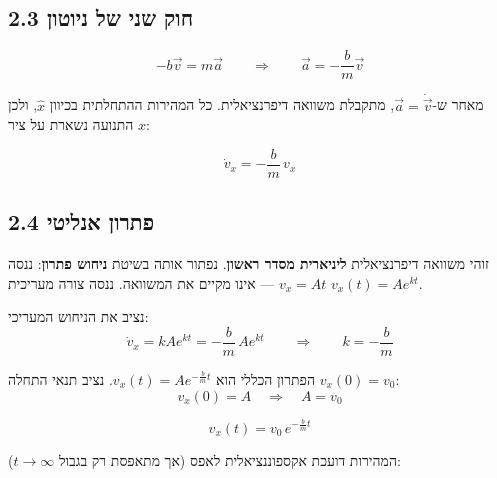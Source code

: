 \documentclass[12pt, a4paper]{article}
\newcommand{\hvec}[1]{\overrightarrow{#1}}
\begin{document}
\subsection*{2.3 חוק שני של ניוטון}

\[
  -b\hvec{v} = m\hvec{a}
  \qquad\Longrightarrow\qquad
  \hvec{a} = -\frac{b}{m}\hvec{v}
\]

מאחר ש-\textenglish{$\hvec{a} = \dot{\hvec{v}}$}, מתקבלת משוואה דיפרנציאלית. כל המהירות ההתחלתית בכיוון \textenglish{$\hat{x}$}, ולכן התנועה נשארת על ציר \textenglish{$x$}:

\begin{tcolorbox}[resultbox]
\[
  \dot{v}_x = -\frac{b}{m}\,v_x
\]
\end{tcolorbox}

\subsection*{2.4 פתרון אנליטי}

\begin{tcolorbox}[notebox, title={אופי המשוואה}]
זוהי משוואה דיפרנציאלית \textbf{ליניארית מסדר ראשון}. נפתור אותה בשיטת \textbf{ניחוש פתרון}:
ננסה \textenglish{$v_x = A t$} --- אינו מקיים את המשוואה. ננסה צורה מעריכית \textenglish{$v_x(t) = A e^{kt}$}.
\end{tcolorbox}

נציב את הניחוש המעריכי:
\[
  \dot{v}_x = kA e^{kt} = -\frac{b}{m}\,A e^{kt}
  \qquad\Longrightarrow\qquad
  k = -\frac{b}{m}
\]

הפתרון הכללי הוא \textenglish{$v_x(t) = A e^{-\frac{b}{m}t}$}. נציב תנאי התחלה \textenglish{$v_x(0) = v_0$}:
\[
  v_x(0) = A \quad\Longrightarrow\quad A = v_0
\]

\begin{tcolorbox}[resultbox, title={דעיכת מהירות תחת גרר}]
\[
  v_x(t) = v_0\, e^{-\frac{b}{m}t}
\]
\end{tcolorbox}

המהירות דועכת אקספוננציאלית לאפס (אך מתאפסת רק בגבול \textenglish{$t\to\infty$}):

\begin{center}
\end{center}
\end{document}
